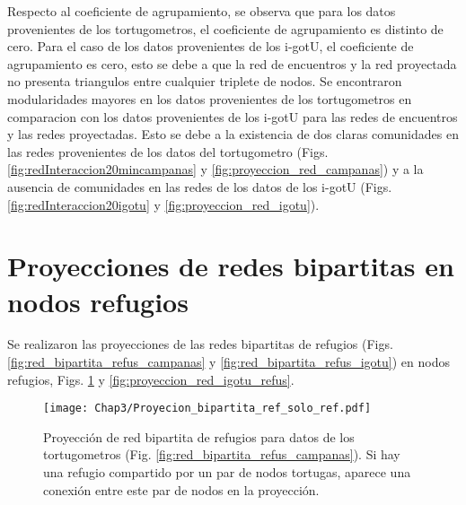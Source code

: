 Respecto al coeficiente de agrupamiento, se observa que para los datos provenientes de los tortugometros, el coeficiente de agrupamiento es distinto de cero. Para el caso de los datos provenientes de los i-gotU, el coeficiente de agrupamiento es cero, esto se debe a que la red de encuentros y la red proyectada no presenta triangulos entre cualquier triplete de nodos. Se encontraron modularidades mayores en los datos provenientes de los tortugometros en comparacion con los datos provenientes de los i-gotU para las redes de encuentros y las redes proyectadas. Esto se debe a la existencia de dos claras comunidades en las redes provenientes de los datos del tortugometro (Figs. \ref{fig:redInteraccion20mincampanas} y \ref{fig:proyeccion_red_campanas}) y a la ausencia de comunidades en las redes de los datos de los i-gotU (Figs. \ref{fig:redInteraccion20igotu} y \ref{fig:proyeccion_red_igotu}).


\section{Proyecciones de redes bipartitas en nodos refugios}
Se realizaron las proyecciones de las redes bipartitas de refugios (Figs. \ref{fig:red_bipartita_refus_campanas} y \ref{fig:red_bipartita_refus_igotu}) en nodos refugios, Figs. \ref{fig:proyeccion_red_campanas_refus} y \ref{fig:proyeccion_red_igotu_refus}.
 
 
\begin{figure}[ht]
    \begin{center}
        \texttt{[image: Chap3/Proyecion\_bipartita\_ref\_solo\_ref.pdf]}
        \caption[Proyección  de red bipartita de refugios para datos de los tortugometros en nodos refugios.]{Proyección  de red bipartita de refugios para datos de los tortugometros (Fig. \ref{fig:red_bipartita_refus_campanas}). Si hay una refugio compartido por un par de nodos tortugas, aparece una conexión entre este par de nodos en la proyección. }
        \label{fig:proyeccion_red_campanas_refus}
       
        \end{center}
\end{figure}
 
